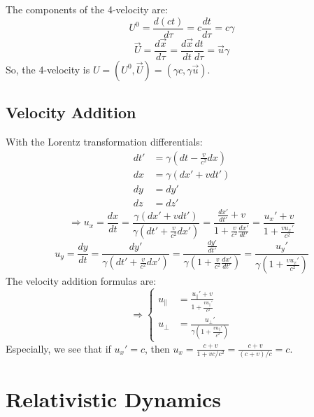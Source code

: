 \documentclass{article}
\begin{document}
	The components of the 4-velocity are:
	\begin{equation*}
		U^0 = \frac{d(ct)}{d\tau} = c \frac{dt}{d\tau} = c\gamma
	\end{equation*}
	\begin{equation*}
		\vec{U} = \frac{d\vec{x}}{d\tau} = \frac{d\vec{x}}{dt} \frac{dt}{d\tau} = \vec{u}\gamma
	\end{equation*}
	So, the 4-velocity is $U = (U^0, \vec{U}) = (\gamma c, \gamma \vec{u})$.
	
	\subsection*{Velocity Addition}
	With the Lorentz transformation differentials:
	\begin{align*}
		dt' &= \gamma \left(dt - \frac{v}{c^2}dx\right) \\
		dx &= \gamma (dx' + v dt') \\
		dy &= dy' \\
		dz &= dz'
	\end{align*}
	\begin{equation*}
		\Rightarrow u_x = \frac{dx}{dt} = \frac{\gamma(dx' + vdt')}{\gamma(dt' + \frac{v}{c^2}dx')} = \frac{\frac{dx'}{dt'} + v}{1 + \frac{v}{c^2}\frac{dx'}{dt'}} = \frac{u_x' + v}{1 + \frac{v u_x'}{c^2}}
	\end{equation*}
	\begin{equation*}
		u_y = \frac{dy}{dt} = \frac{dy'}{\gamma(dt' + \frac{v}{c^2}dx')} = \frac{\frac{dy'}{dt'}}{\gamma(1 + \frac{v}{c^2}\frac{dx'}{dt'})} = \frac{u_y'}{\gamma(1+\frac{v u_x'}{c^2})}
	\end{equation*}
	The velocity addition formulas are:
	\begin{equation}
		\Rightarrow \left\{
		\begin{aligned}
			u_{\parallel} &= \frac{u_{\parallel}' + v}{1+\frac{vu_{\parallel}'}{c^2}} \\
			u_{\perp} &= \frac{u_{\perp}'}{\gamma\left(1+\frac{vu_{\parallel}'}{c^2}\right)}
		\end{aligned}
		\right.
	\end{equation}
	Especially, we see that if $u_x' = c$, then $u_x = \frac{c+v}{1+vc/c^2} = \frac{c+v}{(c+v)/c} = c$.
	
	\section*{Relativistic Dynamics}
	
\end{document}
